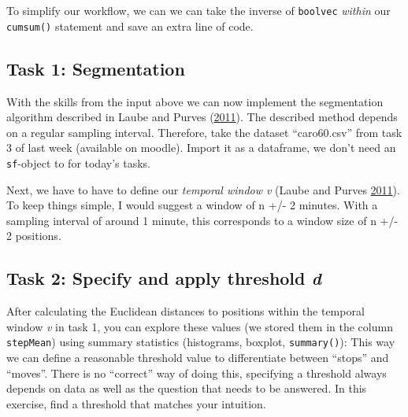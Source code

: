 \documentclass[]{book}
\newenvironment{Shaded}{\begin{snugshade}}{\end{snugshade}}
\newcommand{\CommentTok}[1]{\textcolor[rgb]{0.56,0.35,0.01}{\textit{#1}}}
\newcommand{\DataTypeTok}[1]{\textcolor[rgb]{0.13,0.29,0.53}{#1}}
\newcommand{\KeywordTok}[1]{\textcolor[rgb]{0.13,0.29,0.53}{\textbf{#1}}}
\newcommand{\NormalTok}[1]{#1}
\newcommand{\OperatorTok}[1]{\textcolor[rgb]{0.81,0.36,0.00}{\textbf{#1}}}
\newcommand{\StringTok}[1]{\textcolor[rgb]{0.31,0.60,0.02}{#1}}
\begin{document}
To simplify our workflow, we can we can take the inverse of \texttt{boolvec} \emph{within} our \texttt{cumsum()} statement and save an extra line of code.

\begin{Shaded}
\end{Shaded}

\hypertarget{task-1-segmentation}{%
\subsection{Task 1: Segmentation}\label{task-1-segmentation}}

With the skills from the input above we can now implement the segmentation algorithm described in Laube and Purves (\protect\hyperlink{ref-laube2011}{2011}). The described method depends on a regular sampling interval. Therefore, take the dataset ``caro60.csv'' from task 3 of last week (available on moodle). Import it as a dataframe, we don't need an \texttt{sf}-object to for today's tasks.

Next, we have to have to define our \emph{temporal window v} (Laube and Purves \protect\hyperlink{ref-laube2011}{2011}). To keep things simple, I would suggest a window of n +/- 2 minutes. With a sampling interval of around 1 minute, this corresponds to a window size of n +/- 2 positions.

\hypertarget{task-2-specify-and-apply-threshold-d}{%
\subsection{\texorpdfstring{Task 2: Specify and apply threshold \emph{d}}{Task 2: Specify and apply threshold d}}\label{task-2-specify-and-apply-threshold-d}}

After calculating the Euclidean distances to positions within the temporal window \emph{v} in task 1, you can explore these values (we stored them in the column \texttt{stepMean}) using summary statistics (histograms, boxplot, \texttt{summary()}): This way we can define a reasonable threshold value to differentiate between ``stops'' and ``moves''. There is no ``correct'' way of doing this, specifying a threshold always depends on data as well as the question that needs to be answered. In this exercise, find a threshold that matches your intuition.
\end{document}
